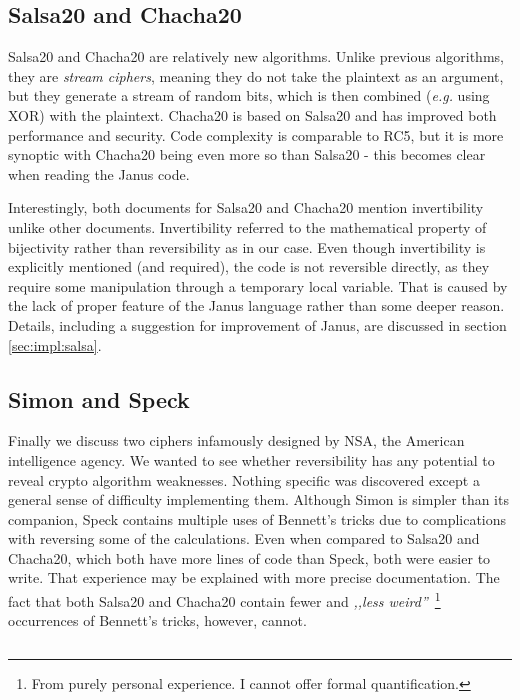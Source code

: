 \documentclass[a4paper,10pt,openright]{memoir}
\newcommand{\eg}{\emph{e.g.}\xspace}
\newcommand{\term}[1]{\textit{#1}}
\begin{document}
\subsection{Salsa20 and Chacha20}

Salsa20 and Chacha20 are relatively new algorithms. Unlike previous 
algorithms, they are \term{stream ciphers}, meaning they do not take 
the plaintext as an argument, but they generate a stream of random 
bits, which is then combined (\eg using XOR) with the plaintext. 
Chacha20 is based on Salsa20 and has improved both performance and 
security. Code complexity is comparable to RC5, but it is more synoptic 
with Chacha20 being even more so than Salsa20 - this becomes clear when 
reading the Janus code.

Interestingly, both documents for Salsa20 and Chacha20 mention 
invertibility unlike other documents. Invertibility referred to the 
mathematical property of bijectivity rather than reversibility as in 
our case. Even though invertibility is explicitly mentioned (and 
required), the code is not reversible directly, as they require some 
manipulation through a temporary local variable. That is caused by the 
lack of proper feature of the Janus language rather than some deeper 
reason. Details, including a suggestion for improvement of Janus, are 
discussed in section \ref{sec:impl:salsa}.

\subsection{Simon and Speck}

Finally we discuss two ciphers infamously designed by NSA, the American 
intelligence agency. We wanted to see whether reversibility has any 
potential to reveal crypto algorithm weaknesses. Nothing specific was 
discovered except a general sense of difficulty implementing them. 
Although Simon is simpler than its companion, Speck contains multiple 
uses of Bennett's tricks due to complications with reversing some of 
the calculations. Even when compared to Salsa20 and Chacha20, which 
both have more lines of code than Speck, both were easier to write. 
That experience may be explained with more precise documentation. The 
fact that both Salsa20 and Chacha20 contain fewer and \textit{,,less 
weird''}~\footnote{From purely personal experience. I cannot offer 
formal quantification.} occurrences of Bennett's tricks, however, 
cannot.

\begin{lstlisting}
\end{lstlisting}
\end{document}
